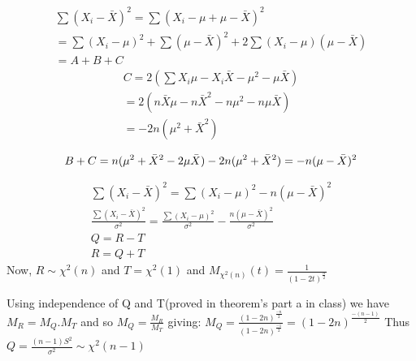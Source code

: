 \documentclass{article}
\begin{document}
\begin{equation}
\begin{split}
	\sum {(X_i-\bar{X})^2} = \sum {(X_i-\mu + \mu-\bar{X} )^2} \\
	= \sum(X_i-\mu)^2+\sum(\mu-\bar{X})^2 + 2\sum{(X_i-\mu)(\mu-\bar{X})} \\
	= A + B + C	
	\end{split}
\end{equation}
\linebreak\linebreak\linebreak\linebreak
\begin{equation}
\begin{split}
	C = 2(\sum{X_i\mu -X_i\bar{X} - \mu^2 - \mu \bar{X} }) \\
	= 2(n\bar{X}\mu -n\bar{X}^2 -n\mu^2 - n\mu\bar{X})\\
	=-2n(\mu^2+\bar{X}^2)
		\end{split}
\end{equation}

\begin{equation}
	B+C=n(\mu^2+\bar{X}^2-2\mu\bar{X})-2n(\mu^2+\bar{X}^2)\\
	=-n(\mu-\bar{X})^2
\end{equation}

\begin{align*}
\sum {(X_i-\bar{X})^2} = \sum(X_i-\mu)^2 -n(\mu-\bar{X})^2 \\
\frac{\sum {(X_i-\bar{X})^2}}{\sigma^2} = \frac{\sum(X_i-\mu)^2}{\sigma^2} -\frac{n(\mu-\bar{X})^2}{\sigma^2}\\
Q=R-T\\
R=Q+T
\end{align*}
Now, $R \sim \chi^2(n)$ and $T=\chi^2(1)$ and 
$M_{\chi^2(n)}(t)=\frac{1}{(1-2t)^{\frac{n}{2}}}$

Using independence of Q and T(proved in theorem's part a in class) we have
$M_R=M_Q.M_T$ and so $M_Q=\frac{M_R}{M_T}$ giving:
$M_Q=\frac{(1-2n)^{\frac{-n}{2}}} {{(1-2n)}^{\frac{-1}{2}}} = (1-2n)^{\frac{-(n-1)}{2}}$
Thus $Q=\frac{(n-1)S^2}{\sigma^2} \sim \chi^2(n-1)$
\end{document}

